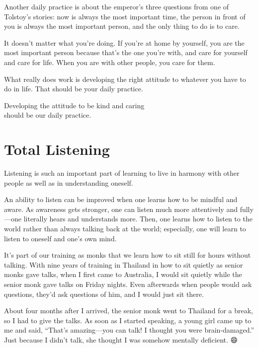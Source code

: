 \documentclass[12pt, openany]{book}
\newenvironment{aphorism}%
{%
\begin{center}\begin{itshape}
}%
{\end{itshape}\end{center}
}%
\newcommand{\fleuron}{%
\begin{center}
\vspace{2em}
\fallbackfont{❦}
\end{center}
}
\begin{document}
Another daily practice is about the emperor’s three questions from one of Tolstoy’s stories: now is always the most important time, the person in front of you is always the most important person, and the only thing to do is to care. 

It doesn’t matter what you’re doing. If you’re at home by yourself, you are the most important person because that’s the one you’re with, and care for yourself and care for life. When you are with other people, you care for them. 

What really does work is developing the right attitude to whatever you have to do in life. That should be your daily practice. 

\begin{aphorism}
Developing the attitude to be kind and caring\\  
should be our daily practice.
\end{aphorism}

\fleuron

\chapter{Total Listening} 

Listening is such an important part of learning to live in harmony with other people as well as in understanding oneself. 

An ability to listen can be improved when one learns how to be mindful and aware. As awareness gets stronger, one can listen much more attentively and fully—one literally hears and understands more. Then, one learns how to listen to the world rather than always talking back at the world; especially, one will learn to listen to oneself and one’s own mind. 

It’s part of our training as monks that we learn how to sit still for hours without talking. With nine years of training in Thailand in how to sit quietly as senior monks gave talks, when I first came to Australia, I would sit quietly while the senior monk gave talks on Friday nights. Even afterwards when people would ask questions, they’d ask questions of him, and I would just sit there. 

About four months after I arrived, the senior monk went to Thailand for a break, so I had to give the talks. As soon as I started speaking, a young girl came up to me and said, “That’s amazing—you can talk! I thought you were brain-damaged.” Just because I didn’t talk, she thought I was somehow mentally deficient. 😄
\end{document}
